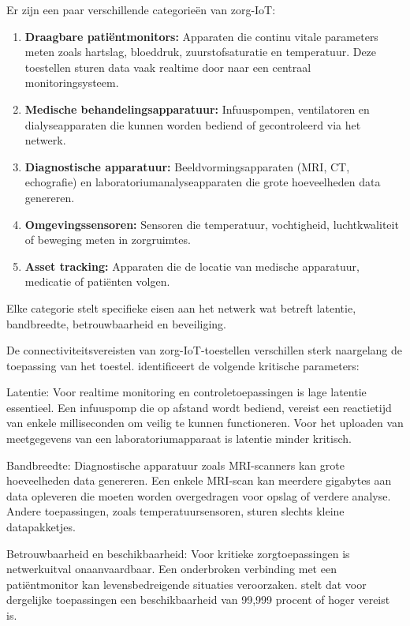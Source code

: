 Er zijn een paar verschillende categorieën van zorg-IoT:

\begin{enumerate}
	\item \textbf{Draagbare patiëntmonitors:} Apparaten die continu vitale parameters meten zoals hartslag, bloeddruk, zuurstofsaturatie en temperatuur. Deze toestellen sturen data vaak realtime door naar een centraal monitoringsysteem.
	\item \textbf{Medische behandelingsapparatuur:} Infuuspompen, ventilatoren en dialyseapparaten die kunnen worden bediend of gecontroleerd via het netwerk.
	\item \textbf{Diagnostische apparatuur:} Beeldvormingsapparaten (MRI, CT, echografie) en laboratoriumanalyseapparaten die grote hoeveelheden data genereren.
	\item \textbf{Omgevingssensoren:} Sensoren die temperatuur, vochtigheid, luchtkwaliteit of beweging meten in zorgruimtes.
	\item \textbf{Asset tracking:} Apparaten die de locatie van medische apparatuur, medicatie of patiënten volgen.
\end{enumerate}
\vspace{0.5cm}

Elke categorie stelt specifieke eisen aan het netwerk wat betreft latentie, bandbreedte, betrouwbaarheid en beveiliging.
\vspace{0.5cm}

De connectiviteitsvereisten van zorg-IoT-toestellen verschillen sterk naargelang de toepassing van het toestel.\textcite{ENISA2022} identificeert de volgende kritische parameters:
\vspace{0.5cm}

Latentie: Voor realtime monitoring en controletoepassingen is lage latentie essentieel. Een infuuspomp die op afstand wordt bediend, vereist een reactietijd van enkele milliseconden om veilig te kunnen functioneren. Voor het uploaden van meetgegevens van een laboratoriumapparaat is latentie minder kritisch.
\vspace{0.5cm}

Bandbreedte: Diagnostische apparatuur zoals MRI-scanners kan grote hoeveelheden data genereren. Een enkele MRI-scan kan meerdere gigabytes aan data opleveren die moeten worden overgedragen voor opslag of verdere analyse. Andere toepassingen, zoals temperatuursensoren, sturen slechts kleine datapakketjes.
\vspace{0.5cm}

Betrouwbaarheid en beschikbaarheid: Voor kritieke zorgtoepassingen is netwerkuitval onaanvaardbaar. Een onderbroken verbinding met een patiëntmonitor kan levensbedreigende situaties veroorzaken. \textcite{ENISA2022} stelt dat voor dergelijke toepassingen een beschikbaarheid van 99,999 procent of hoger vereist is.
\vspace{0.5cm}

